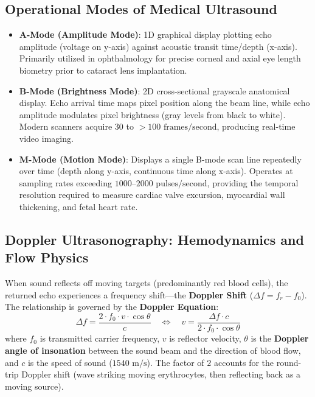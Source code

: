 \documentclass[11pt,a4paper]{article}
\begin{document}
\subsection{Operational Modes of Medical Ultrasound}
\begin{itemize}[leftmargin=*]
    \item \textbf{A-Mode (Amplitude Mode)}: 1D graphical display plotting echo amplitude (voltage on y-axis) against acoustic transit time/depth (x-axis). Primarily utilized in ophthalmology for precise corneal and axial eye length biometry prior to cataract lens implantation.
    \item \textbf{B-Mode (Brightness Mode)}: 2D cross-sectional grayscale anatomical display. Echo arrival time maps pixel position along the beam line, while echo amplitude modulates pixel brightness (gray levels from black to white). Modern scanners acquire 30 to $>100\text{ frames/second}$, producing real-time video imaging.
    \item \textbf{M-Mode (Motion Mode)}: Displays a single B-mode scan line repeatedly over time (depth along y-axis, continuous time along x-axis). Operates at sampling rates exceeding $1000\text{--}2000\text{ pulses/second}$, providing the temporal resolution required to measure cardiac valve excursion, myocardial wall thickening, and fetal heart rate.
\end{itemize}

\subsection{Doppler Ultrasonography: Hemodynamics and Flow Physics}
When sound reflects off moving targets (predominantly red blood cells), the returned echo experiences a frequency shift—the \textbf{Doppler Shift} ($\Delta f = f_r - f_0$). The relationship is governed by the \textbf{Doppler Equation}:
\begin{equation}
    \Delta f = \frac{2 \cdot f_0 \cdot v \cdot \cos\theta}{c} \quad \iff \quad v = \frac{\Delta f \cdot c}{2 \cdot f_0 \cdot \cos\theta}
\end{equation}
where $f_0$ is transmitted carrier frequency, $v$ is reflector velocity, $\theta$ is the \textbf{Doppler angle of insonation} between the sound beam and the direction of blood flow, and $c$ is the speed of sound ($1540\text{ m/s}$). The factor of $2$ accounts for the round-trip Doppler shift (wave striking moving erythrocytes, then reflecting back as a moving source).
\end{document}
